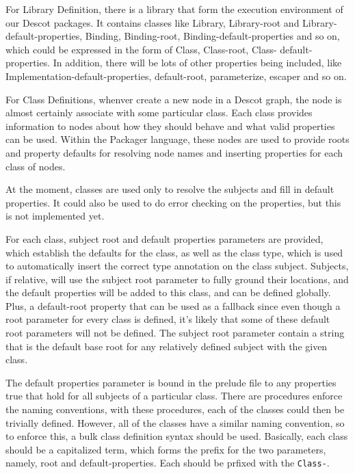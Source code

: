 For Library Definition, there is a library that form the execution environment
of our Descot packages. It contains classes like Library, Library-root and 
Library-default-properties, Binding, Binding-root, Binding-default-properties 
and so on, which could be expressed in the form of Class, Class-root, Class-
default-properties. In addition, there will be lots of other properties being 
included, like Implementation-default-properties, default-root, parameterize,
escaper and so on.

For Class Definitions, whenver create a new node in a Descot graph, the node is 
almost certainly associate with some particular class. Each class 
provides information to nodes about how they should behave and what valid 
properties can be used. Within the Packager language, these nodes are used 
to provide roots and property defaults for resolving node names and 
inserting properties for each class of nodes.

At the moment, classes are used only to resolve the subjects and fill 
in default properties. It could also be used to do error checking on 
the properties, but this is not implemented yet.

For each class, subject root and default properties parameters are provided, 
which establish the defaults for the class, as well as the class type, which 
is used to automatically insert the correct type annotation on the class 
subject. Subjects, if relative, will use the subject root parameter to fully 
ground their locations, and the default properties will be added to this class, 
and can be defined globally. Plus, a default-root property that can be used as 
a fallback since even though a root parameter for every class is defined, it's 
likely that some of these default root parameters will not be defined. The 
subject root parameter contain a string that is the default base root for any 
relatively defined subject with the given class.

The default properties parameter is bound in the prelude file to 
any properties true that hold for all subjects of a particular class.
There are procedures enforce the naming conventions, with these procedures, 
each of the classes could then be trivially defined. However, all of the
classes have a similar naming convention, so to enforce this, a bulk class 
definition syntax should be used. Basically, each class should be a 
capitalized term, which forms the prefix for the two parameters, namely, 
root and default-properties. Each should be prfixed with the {\tt Class-}.

